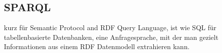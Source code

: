 \subsection{SPARQL} 
kurz für Semantic Protocol and RDF Query Language, ist wie SQL für tabellenbasierte Datenbanken, eine Anfragesprache, mit der man gezielt Informationen aus einem RDF Datenmodell extrahieren kann.